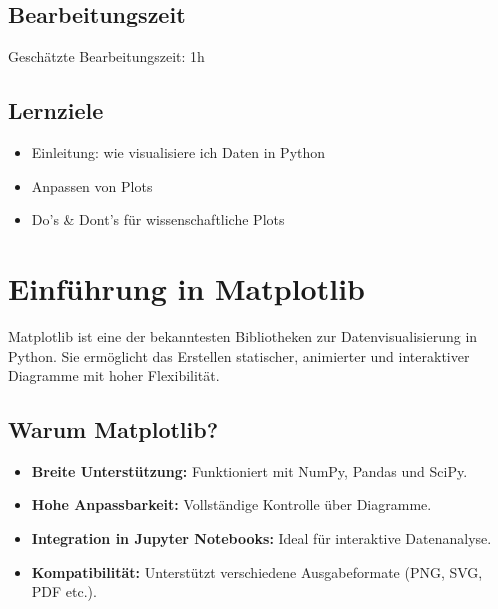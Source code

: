 \documentclass[
  letterpaper,
  DIV=11,
  numbers=noendperiod]{scrreprt}
\providecommand{\tightlist}{%
  \setlength{\itemsep}{0pt}\setlength{\parskip}{0pt}}\usepackage{longtable,booktabs,array}
\begin{document}
\begin{tcolorbox}
\section*{Bearbeitungszeit}\label{bearbeitungszeit-1}


Geschätzte Bearbeitungszeit: 1h

\section*{Lernziele}\label{lernziele-2}


\begin{itemize}
\tightlist
\item
  Einleitung: wie visualisiere ich Daten in Python
\item
  Anpassen von Plots
\item
  Do's \& Dont's für wissenschaftliche Plots
\end{itemize}

\chapter{Einführung in Matplotlib}\label{einfuxfchrung-in-matplotlib}

Matplotlib ist eine der bekanntesten Bibliotheken zur
Datenvisualisierung in Python. Sie ermöglicht das Erstellen statischer,
animierter und interaktiver Diagramme mit hoher Flexibilität.

\section{Warum Matplotlib?}\label{warum-matplotlib}

\begin{itemize}
\tightlist
\item
  \textbf{Breite Unterstützung:} Funktioniert mit NumPy, Pandas und
  SciPy.
\item
  \textbf{Hohe Anpassbarkeit:} Vollständige Kontrolle über Diagramme.
\item
  \textbf{Integration in Jupyter Notebooks:} Ideal für interaktive
  Datenanalyse.
\item
  \textbf{Kompatibilität:} Unterstützt verschiedene Ausgabeformate (PNG,
  SVG, PDF etc.).
\end{itemize}


\end{tcolorbox}
\end{document}
